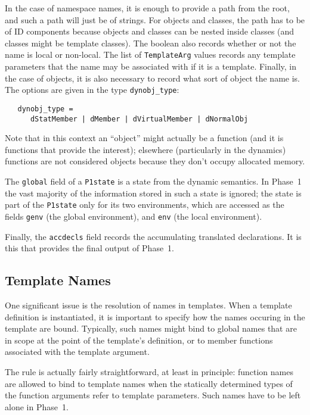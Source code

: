 \documentclass[11pt]{article}
\begin{document}
In the case of namespace names, it is enough to provide a path from
the root, and such a path will just be of strings.  For objects and
classes, the path has to be of ID components because objects and
classes can be nested inside classes (and classes might be template
classes).  The boolean also records whether or not the name is local
or non-local.  The list of \texttt{TemplateArg} values records any
template parameters that the name may be associated with if it is a
template.  Finally, in the case of objects, it is also necessary to
record what sort of object the name is.  The options are given in the
type \texttt{dynobj_type}:
\begin{verbatim}
   dynobj_type =
      dStatMember | dMember | dVirtualMember | dNormalObj
\end{verbatim}
Note that in this context an ``object'' might actually be a function
(and it is functions that provide the interest); elsewhere
(particularly in the dynamics) functions are not considered objects
because they don't occupy allocated memory.

The \texttt{global} field of a \texttt{P1state} is a state from the
dynamic semantics.  In Phase~1 the vast majority of the information
stored in such a state is ignored; the state is part of the
\texttt{P1state} only for its two environments, which are accessed as
the fields \texttt{genv} (the global environment), and \texttt{env}
(the local environment).
%
%

Finally, the \texttt{accdecls} field records the accumulating
translated declarations.  It is this that provides the final output of
Phase~1.

\subsection{Template Names}
\label{sec:p1-template-names}

One significant issue is the resolution of names in templates.  When a
template definition is instantiated, it is important to specify how
the names occuring in the template are bound.  Typically, such names
might bind to global names that are in scope at the point of the
template's definition, or to member functions associated with the
template argument.

The rule is actually fairly straightforward, at least in principle:
function names are allowed to bind to template names when the
statically determined types of the function arguments refer to
template parameters.  Such names have to be left alone in Phase~1.
\end{document}
